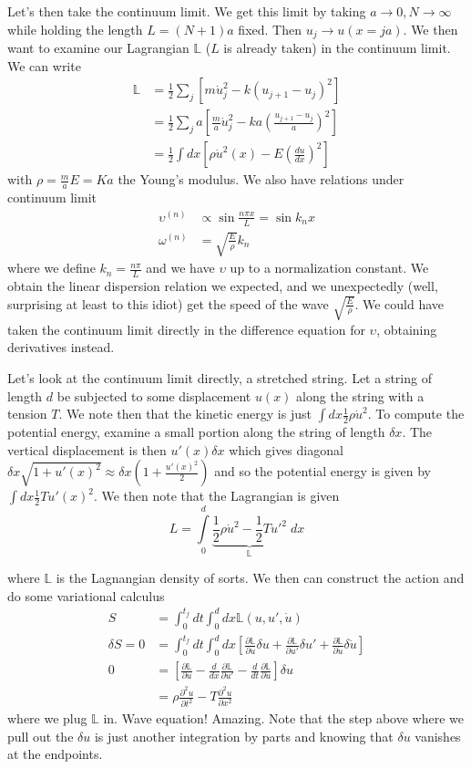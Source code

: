 \documentclass[10pt]{report}
\newcommand{\rd}[2]{\frac{d#1}{d#2}}
\newcommand{\pd}[2]{\frac{\partial #1}{\partial#2}}
\newcommand{\ptd}[2]{\frac{\partial^2 #1}{\partial#2^2}}
\begin{document}
Let's then take the continuum limit. We get this limit by taking $a \to 0, N \to \infty$ while holding the length $L = (N+1)a$ fixed. Then $u_j \to u(x = ja)$. We then want to examine our Lagrangian $\mathbb{L}$ ($L$ is already taken) in the continuum limit. We can write
\begin{align*}
    \mathbb{L} &= \frac{1}{2}\sum_j\left[m\dot{u}_j^2 - k\left( u_{j+1} - u_j \right)^2\right]\\
    &= \frac{1}{2}\sum_j a\left[\frac{m}{a}\dot{u}_j^2 - ka\left( \frac{u_{j+1} - u_j}{a} \right)^2\right]\\
    &= \frac{1}{2}\int dx \left[ \rho \dot{u}^2(x) - E\left( \rd{u}{x} \right)^2 \right]
\end{align*}
with $\rho = \frac{m}{a} E = Ka$ the Young's modulus. We also have relations under continuum limit
\begin{align*}
    \upsilon^{(n)} &\propto \sin \frac{n\pi x}{L} = \sin k_nx\\
    \omega^{(n)} &= \sqrt{\frac{E}{\rho}}k_n
\end{align*}
where we define $k_n = \frac{n\pi}{L}$ and we have $\upsilon$ up to a normalization constant. We obtain the linear dispersion relation we expected, and we unexpectedly (well, surprising at least to this idiot) get the speed of the wave $\sqrt{\frac{E}{\rho}}$. We could have taken the continuum limit directly in the difference equation for $\upsilon$, obtaining derivatives instead.

Let's look at the continuum limit directly, a stretched string. Let a string of length $d$ be subjected to some displacement $u(x)$ along the string with a tension $T$. We note then that the kinetic energy is just $\int dx \frac{1}{2}\rho \dot{u}^2$. To compute the potential energy, examine a small portion along the string of length $\delta x$. The vertical displacement is then $u'(x) \delta x$ which gives diagonal $\delta x \sqrt{1 + u'(x)^2} \approx \delta x\left(1+ \frac{u'(x)^2}{2}\right)$ and so the potential energy is given by $\int dx \frac{1}{2}Tu'(x)^2$. We then note that the Lagrangian is given
$$L = \displaystyle\int\limits_{0}^{d}\underbrace{\frac{1}{2}\rho \dot{u}^2 - \frac{1}{2}Tu'^2}_{\mathbb{L}}\;dx$$

where $\mathbb{L}$ is the Lagnangian density of sorts. We then can construct the action and do some variational calculus
\begin{align*}
    S &= \int_0^{t_f} dt \int_0^d dx \mathbb{L}(u,u',\dot{u})\\
    \delta S = 0 &= \int_0^{t_f} dt \int_0^d dx \left[ \pd{\mathbb{L}}{u}\delta u + \pd{\mathbb{L}}{u'}\delta u' + \pd{\mathbb{L}}{\dot{u}}\delta\dot{u} \right]\\
    0&= \left[ \pd{\mathbb{L}}{u} - \rd{}{x}\pd{\mathbb{L}}{u'} - \rd{}{t}\pd{\mathbb{L}}{\dot{u}} \right]\delta u\\
    &= \rho \ptd{u}{t} - T\ptd{u}{x}
\end{align*}
where we plug $\mathbb{L}$ in. Wave equation! Amazing. Note that the step above where we pull out the $\delta u$ is just another integration by parts and knowing that $\delta u$ vanishes at the endpoints.
\end{document}
